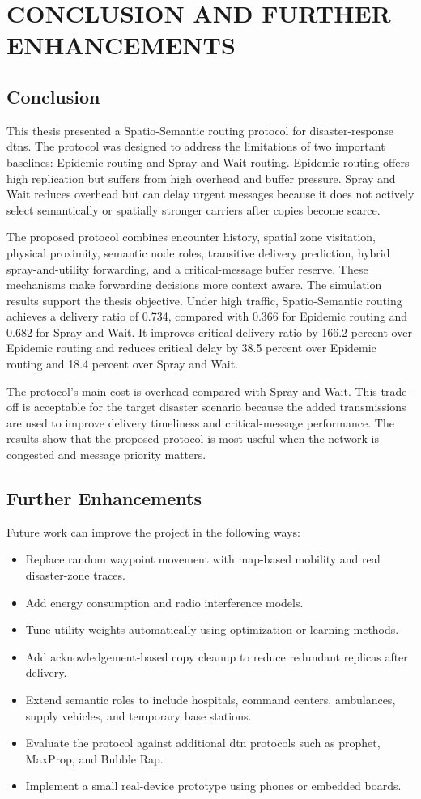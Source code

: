 \chapter{\MakeUppercase{Conclusion and Further Enhancements}}
\section{Conclusion}
This thesis presented a Spatio-Semantic routing protocol for disaster-response \acp{dtn}. The protocol was designed to address the limitations of two important baselines: Epidemic routing and Spray and Wait routing. Epidemic routing offers high replication but suffers from high overhead and buffer pressure. Spray and Wait reduces overhead but can delay urgent messages because it does not actively select semantically or spatially stronger carriers after copies become scarce.

The proposed protocol combines encounter history, spatial zone visitation, physical proximity, semantic node roles, transitive delivery prediction, hybrid spray-and-utility forwarding, and a critical-message buffer reserve. These mechanisms make forwarding decisions more context aware. The simulation results support the thesis objective. Under high traffic, Spatio-Semantic routing achieves a delivery ratio of 0.734, compared with 0.366 for Epidemic routing and 0.682 for Spray and Wait. It improves critical delivery ratio by 166.2 percent over Epidemic routing and reduces critical delay by 38.5 percent over Epidemic routing and 18.4 percent over Spray and Wait.

The protocol's main cost is overhead compared with Spray and Wait. This trade-off is acceptable for the target disaster scenario because the added transmissions are used to improve delivery timeliness and critical-message performance. The results show that the proposed protocol is most useful when the network is congested and message priority matters.

\section{Further Enhancements}
Future work can improve the project in the following ways:

\begin{itemize}
	\item Replace random waypoint movement with map-based mobility and real disaster-zone traces.
	\item Add energy consumption and radio interference models.
	\item Tune utility weights automatically using optimization or learning methods.
	\item Add acknowledgement-based copy cleanup to reduce redundant replicas after delivery.
	\item Extend semantic roles to include hospitals, command centers, ambulances, supply vehicles, and temporary base stations.
	\item Evaluate the protocol against additional \ac{dtn} protocols such as \ac{prophet}, MaxProp, and Bubble Rap.
	\item Implement a small real-device prototype using phones or embedded boards.
\end{itemize}

